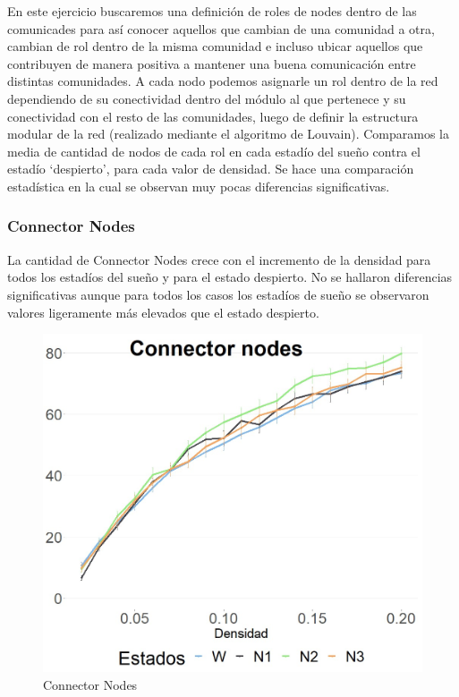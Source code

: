 
En este ejercicio buscaremos una definición de roles de nodes dentro de las comunicades para así conocer aquellos que cambian de una comunidad a otra, cambian de rol dentro de la misma comunidad e incluso ubicar aquellos que contribuyen de manera positiva a mantener una buena comunicación entre distintas comunidades.
A cada nodo podemos asignarle un rol dentro de la red dependiendo de su conectividad dentro del módulo al que pertenece y su conectividad con el resto de las comunidades, luego de definir la estructura modular de la red (realizado mediante el algoritmo de Louvain). 
Comparamos la media de cantidad de nodos de cada rol en cada estadío del sueño contra el estadío ‘despierto’, para cada valor de densidad. Se hace una comparación estadística en la cual se observan muy pocas diferencias significativas.


\subsubsection{Connector Nodes}
La cantidad de Connector Nodes crece con el incremento de la densidad para todos los estadíos del sueño y para el estado despierto. No se hallaron diferencias significativas aunque para todos los casos los estadíos de sueño se observaron valores ligeramente más elevados que el estado despierto.


\begin{figure}[H]
    \centering
    \includegraphics[width = 5in]{img/5_connectornodes.jpg}
    \caption{Connector Nodes}
    \label{fig:5_connectornodes}
\end{figure}

